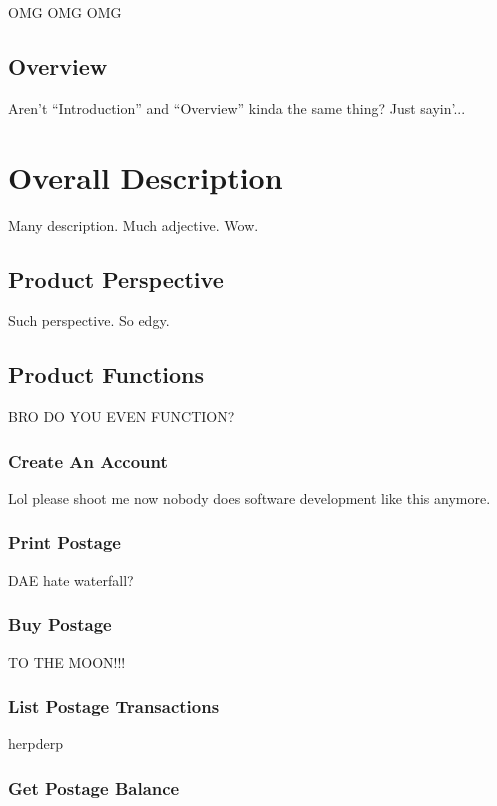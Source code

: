 \documentclass{scrreprt}
\begin{document}
OMG OMG OMG

\section{Overview}

Aren't ``Introduction'' and ``Overview'' kinda the same thing? Just sayin'...

\chapter{Overall Description}

Many description. Much adjective. Wow.

\section{Product Perspective}

Such perspective. So edgy.

\section{Product Functions}

BRO DO YOU EVEN FUNCTION?

\subsection{Create An Account}

Lol please shoot me now nobody does software development like this anymore.

\subsection{Print Postage}

DAE hate waterfall?

\subsection{Buy Postage}

TO THE MOON!!!

\subsection{List Postage Transactions}

herpderp

\subsection{Get Postage Balance}
\end{document}
